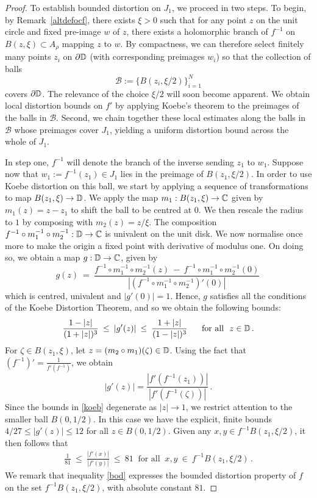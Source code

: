 \documentclass[11pt,reqno]{amsart}
\newcommand{\C}{{\Bbb C}}
\newcommand{\D}{{\Bbb D}}
\newcommand{\0}{\mathbf{0}}
\theoremstyle{remark}
\numberwithin{equation}{section}
\theoremstyle{remark}
\numberwithin{equation}{section}
\begin{document}
\begin{proof}
  To establish bounded distortion on $J_1$, we proceed in two steps. To begin, by Remark~\ref{altdefocf}, there exists $\xi > 0$ such that for any point $z$ on the unit circle and fixed pre-image $w$ of $z$, there exists a  holomorphic branch of $f^{-1}$ on $B(z,\xi) \subset {A}_{\rho}$ mapping $z$ to $w$. By compactness, we can therefore select finitely many points ${z_i}$ on $\partial \D$ (with corresponding preimages ${w_i}$) so that the collection of balls $$\mathscr{B}:=\{B(z_i,\xi/2)\}_{i=1}^N$$ covers $\partial \D$. The relevance of the choice $\xi/2$ will soon become apparent.
We obtain local distortion bounds on $f'$ by applying Koebe’s theorem to the preimages of the balls in $\mathscr{B}$. Second, we chain together these local estimates along the balls in $\mathscr{B}$ whose preimages cover $J_1$, yielding a uniform distortion bound across the whole of $J_1$.

In step one, $f^{-1}$ will denote the branch of the inverse sending $z_1$ to $w_1$.
Suppose now that $w_1:=f^{-1}(z_1) \in J_1$ lies in the preimage of $B(z_1,\xi/2)$. In order to use Koebe distortion on this ball, we start by applying a sequence of transformations to map $B(z_1,\xi) \to \D$. We apply the map $m_1: B(z_1,\xi) \to \C$ given by $m_1(z)=z-z_1$ to shift the ball to be centred at 0. We then rescale the radius to $1$ by composing with $m_2(z)=z/\xi$. The composition $f^{-1}\circ m_1^{-1}\circ m_2^{-1}: \D \to \C$ is univalent on the unit disk. We now normalise once more to make the origin a fixed point with derivative of modulus one.
On doing so, we obtain a map $g: \D \to \C$, given by
$$g(z) \: = \:  \frac{f^{-1}\circ m_1^{-1}\circ m_2^{-1}(z) \:- \: f^{-1}\circ m_1^{-1}\circ m_2^{-1}(0) }{|(f^{-1}\circ m_1^{-1}\circ m_2^{-1})'(0)|} \, $$
which is centred, univalent and $|g'(0)|=1$. Hence, $g$ satisfies all the conditions of the Koebe Distortion Theorem, and so we obtain the following bounds: 
\begin{eqnarray}\label{koeb}
    \frac{1-|z|}{(1+|z|)^3}  \: \leq \: |g'(z)|\:  \leq \: \frac{1+|z|}{(1-|z|)^3} \quad \text{ \ for all \ } z \in \D\, .
\end{eqnarray} 
For $\zeta \in B(z_1,\xi)$, let $z=(m_2 \circ m_1)(\zeta) \in \D$. Using the fact that $(f^{-1})'=\frac{1}{f'(f^{-1})}$, we obtain $$|g'(z)|= \frac{|f'(f^{-1}(z_1))|}{|f'(f^{-1}(\zeta))|} \, .$$
Since the bounds in \eqref{koeb} degenerate as $|z|\to 1$, we restrict attention to the smaller ball $B(0,1/2)$. In this case we have the explicit, finite bounds $4/27 \leq |g'(z)| \leq 12$ for all $z \in B(0,1/2)$. 
 Given any $x,y \in f^{-1}B(z_1,\xi/2)$, it then follows that 
\begin{eqnarray}\label{bod}
\frac{1}{81} \: \leq \: \frac{|f'(x)|}{|f'(y)|} \: \leq \: 81 \: \text{ \ for all \ }\: x,y \:  \in \: f^{-1}B(z_1,\xi/2) \, .
\end{eqnarray} 
We remark that inequality \eqref{bod} expresses the bounded distortion property of $f$ on the set $f^{-1}B(z_1,\xi/2)$, with absolute constant $81$.


\end{proof}
\end{document}
